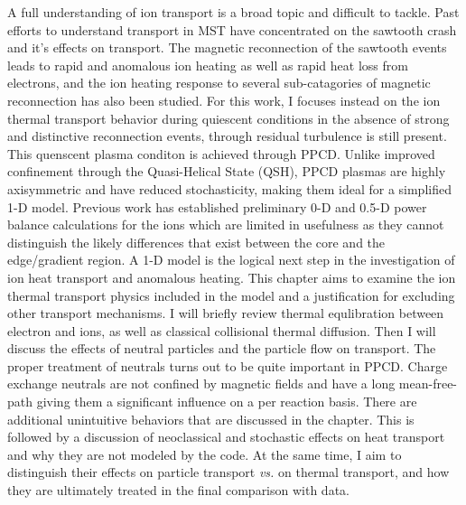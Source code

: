 \begin{refsection}
A full understanding of ion transport is a broad topic and difficult to tackle. Past efforts to understand transport in MST have concentrated on the sawtooth crash and it's effects on transport. The magnetic reconnection of the sawtooth events leads to rapid and anomalous ion heating as well as rapid heat loss from electrons\cite{Chapman2010}, and the ion heating response to several sub-catagories of magnetic reconnection has also been studied\cite{Gangadhara2008}. For this work, I focuses instead on the ion thermal transport behavior during quiescent conditions in the absence of strong and distinctive reconnection events, through residual turbulence is still present. This quenscent plasma conditon is achieved through PPCD. Unlike improved confinement through the Quasi-Helical State (QSH), PPCD plasmas are highly axisymmetric and have reduced stochasticity, making them ideal for a simplified 1-D model. Previous work has established preliminary 0-D and 0.5-D power balance calculations for the ions\cite{Waksman2013} which are limited in usefulness as they cannot distinguish the likely differences that exist between the core and the edge/gradient region. A 1-D model is the logical next step in the investigation of ion heat transport and anomalous heating. This chapter aims to examine the ion thermal transport physics included in the model and a justification for excluding other transport mechanisms.  I will briefly review thermal equlibration between electron and ions, as well as classical collisional thermal diffusion. Then I will discuss the effects of neutral particles and the particle flow on transport. The proper treatment of neutrals turns out to be quite important in PPCD. Charge exchange neutrals are not confined by magnetic fields and have a long mean-free-path giving them a significant  influence on a per reaction basis. There are additional unintuitive behaviors that are discussed in the chapter. This is followed by a discussion of neoclassical and stochastic effects on heat transport and why they are not modeled by the code. At the same time, I aim to distinguish their effects on particle transport {\em vs.} on thermal transport, and how they are ultimately treated in the final comparison with data. 



\end{refsection}
